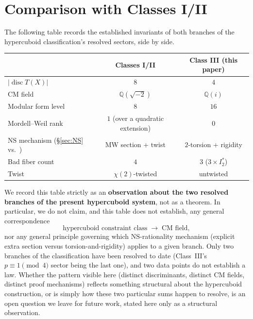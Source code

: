 \documentclass[11pt]{amsart}
\theoremstyle{definition}
\newcommand{\Q}{\mathbb{Q}}
\newcommand{\NS}{\mathrm{NS}}
\DeclareMathOperator{\disc}{disc}
\begin{document}
\section{Comparison with Classes I/II}
\label{sec:comparison}

The following table records the established invariants of both branches
of the hypercuboid classification's resolved sectors, side by side.

\begin{center}
\begin{tabular}{l|c|c}
 & Classes I/II \cite{ClassesI_II} & Class III (this paper)\\\hline
$|\disc T(X)|$ & $8$ & $4$\\
CM field & $\Q(\sqrt{-2})$ & $\Q(i)$\\
Modular form level & $8$ & $16$\\
Mordell--Weil rank & $1$ (over a quadratic extension) & $0$\\
$\NS$ mechanism (\S\ref{sec:NS} vs.\ \cite{ClassesI_II}) & MW section + twist & $2$-torsion + rigidity\\
Bad fiber count & $4$ & $3$ ($3\times I_2^*$)\\
Twist & $\chi(2)$-twisted & untwisted
\end{tabular}
\end{center}

We record this table strictly as an \textbf{observation about the two
resolved branches of the present hypercuboid system}, not as a theorem.
In particular, we do not claim, and this table does not establish, any
general correspondence
\[
\text{hypercuboid constraint class} \;\longrightarrow\; \text{CM field},
\]
nor any general principle governing which $\NS$-rationality mechanism
(explicit extra section versus torsion-and-rigidity) applies to a given
branch. Only two branches of the classification have been resolved to
date (Class~III's $p\equiv1\pmod4$ sector being the last one), and two
data points do not establish a law. Whether the pattern visible here
(distinct discriminants, distinct CM fields, distinct proof mechanisms)
reflects something structural about the hypercuboid construction, or is
simply how these two particular sums happen to resolve, is an open
question we leave for future work, stated here only as a structural
observation.
\end{document}
